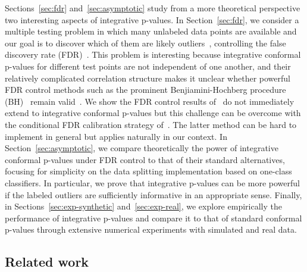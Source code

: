 \documentclass[11pt]{article}
\begin{document}
Sections~\ref{sec:fdr} and~\ref{sec:asymptotic} study from a more theoretical perspective two interesting aspects of integrative p-values.
In Section~\ref{sec:fdr}, we consider a multiple testing problem in which many unlabeled data points are available and our goal is to discover which of them are likely outliers~\cite{bates2021testing,mary2021semi}, controlling the false discovery rate (FDR)~\cite{benjamini1995controlling}. This problem is interesting because integrative conformal p-values for different test points are not independent of one another, and their relatively complicated correlation structure makes it unclear whether powerful FDR control methods such as the prominent Benjiamini-Hochberg procedure (BH)~\cite{benjamini1995controlling} remain valid~\cite{benjamini2001control}.
We show the FDR control results of~\cite{bates2021testing} do not immediately extend to integrative conformal p-values but this challenge can be overcome with the conditional FDR calibration strategy of~\cite{fithian2020conditional}. The latter method can be hard to implement in general but applies naturally in our context.
In Section~\ref{sec:asymptotic}, we compare theoretically the power of integrative conformal p-values under FDR control to that of their standard alternatives, focusing for simplicity on the data splitting implementation based on one-class classifiers.
In particular, we prove that integrative p-values can be more powerful if the labeled outliers are sufficiently informative in an appropriate sense.
Finally, in Sections~\ref{sec:exp-synthetic} and~\ref{sec:exp-real}, we explore empirically the performance of integrative p-values and compare it to that of standard conformal p-values through extensive numerical experiments with simulated and real data.


\subsection{Related work} \label{sec:preview}

\end{document}
